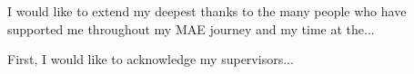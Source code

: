 
\begin{acknowledgements}

I would like to extend my deepest thanks to the many people who have supported
me throughout my \gls{MAE} journey and my time at the...

\noindent
First, I would like to acknowledge my supervisors...


\end{acknowledgements}
